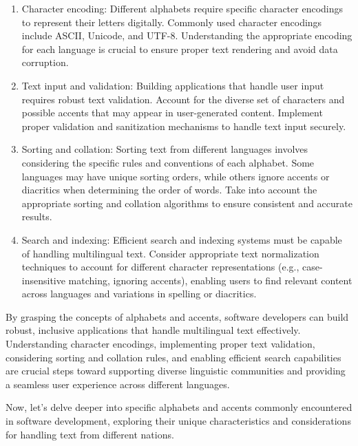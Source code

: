 \begin{enumerate}
\item Character encoding: Different alphabets require specific character encodings to represent their letters digitally. Commonly used character encodings include ASCII, Unicode, and UTF-8. Understanding the appropriate encoding for each language is crucial to ensure proper text rendering and avoid data corruption.

\item Text input and validation: Building applications that handle user input requires robust text validation. Account for the diverse set of characters and possible accents that may appear in user-generated content. Implement proper validation and sanitization mechanisms to handle text input securely.

\item Sorting and collation: Sorting text from different languages involves considering the specific rules and conventions of each alphabet. Some languages may have unique sorting orders, while others ignore accents or diacritics when determining the order of words. Take into account the appropriate sorting and collation algorithms to ensure consistent and accurate results.

\item Search and indexing: Efficient search and indexing systems must be capable of handling multilingual text. Consider appropriate text normalization techniques to account for different character representations (e.g., case-insensitive matching, ignoring accents), enabling users to find relevant content across languages and variations in spelling or diacritics.
\end{enumerate}

By grasping the concepts of alphabets and accents, software developers can build robust, inclusive applications that handle multilingual text effectively. Understanding character encodings, implementing proper text validation, considering sorting and collation rules, and enabling efficient search capabilities are crucial steps toward supporting diverse linguistic communities and providing a seamless user experience across different languages.

Now, let's delve deeper into specific alphabets and accents commonly encountered in software development, exploring their unique characteristics and considerations for handling text from different nations.


